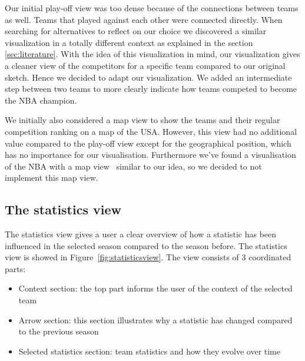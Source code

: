 \documentclass[chi_draft]{sigchi}
\begin{document}
Our initial play-off view was too dense because of the connections between teams
as well. Teams that played against each other were connected directly. When
searching for alternatives to reflect on our choice we discovered a similar
visualization in a totally different context\cite{whitehousepath} as explained in 
the section \ref{sec:literature}. With the idea of this visualization in mind, our 
visualization gives a cleaner view of the competitors for a specific team compared 
to our original sketch. Hence we decided to adapt our visualization. We added an 
intermediate step between two teams to more clearly indicate how teams competed to 
become the NBA champion. 


We initially also considered a map view to show the teams and their regular
competition ranking on a map of the USA. However, this view had no additional
value compared to the play-off view except for the geographical position, which
has no importance for our visualisation. Furthermore we've found a visualisation
of the NBA with a map view~\cite{mapviewvisualization} similar to our idea, so
we decided to not implement this map view. 

\subsection{The statistics view}
The statistics view gives a user a clear overview of how a statistic has been
influenced in the selected season compared to the season before. The statistics
view is showed in Figure~\ref{fig:statisticsview}. The view consists of 3
coordinated parts:
\begin{itemize}
    \item Context section: the top part informs the user of the context of the
        selected team
    \item Arrow section: this section illustrates why a statistic has changed
        compared to the previous season
    \item Selected statistics section: team statistics and how they evolve over
        time
\end{itemize}
\end{document}
